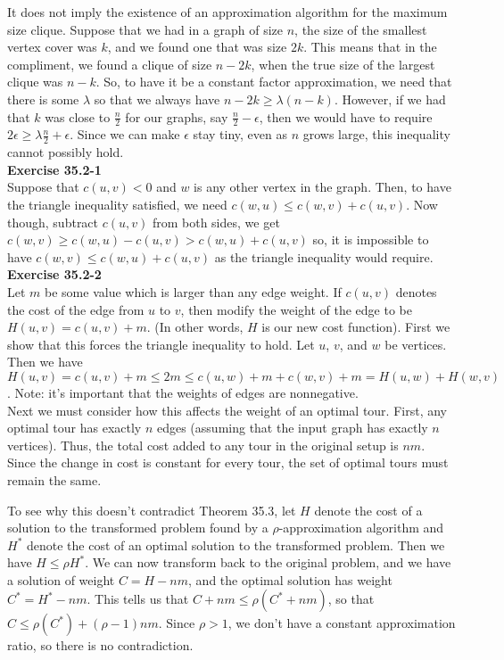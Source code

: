 \documentclass{article}
\begin{document}
It does not imply the existence of an approximation algorithm for the maximum size clique. Suppose that we had in a graph of size $n$, the size of the smallest vertex cover was $k$, and we found one that was size $2k$. This means that in the compliment, we found a clique of size $n-2k$, when the true size of the largest clique was $n-k$. So, to have it be a constant factor approximation, we need that there is some $\lambda$ so that we always have $n-2k \ge \lambda (n-k)$. However, if we had that $k$ was close to $\frac{n}{2}$ for our graphs, say $\frac{n}{2}-\epsilon$, then we would have to require $2\epsilon \ge \lambda \frac{n}{2} + \epsilon$. Since we can make $\epsilon$ stay tiny, even as $n$ grows large, this inequality cannot possibly hold.\\




\noindent\textbf{Exercise 35.2-1}\\

Suppose that $c(u,v) < 0$ and $w$ is any other vertex in the graph. Then, to have the triangle inequality satisfied, we need $c(w,u) \le c(w,v) + c(u,v)$. Now though, subtract $c(u,v)$ from both sides, we get $c(w,v) \ge c(w,u) - c(u,v) > c(w,u) +c(u,v)$ so, it is impossible to have $c(w,v) \le c(w,u)+c(u,v)$ as the triangle inequality would require.\\

\noindent\textbf{Exercise 35.2-2}\\

Let $m$ be some value which is larger than any edge weight.  If $c(u,v)$ denotes the cost of the edge from $u$ to $v$, then modify the weight of the edge to be $H(u,v) = c(u,v) + m$.  (In other words, $H$ is our new cost function).  First we show that this forces the triangle inequality to hold.  Let $u$, $v$, and $w$ be vertices.  Then we have $H(u,v) = c(u,v) + m \leq 2m \leq c(u,w) + m + c(w,v) + m = H(u,w) + H(w,v)$.  Note: it's important that the weights of edges are nonnegative.  \\

Next we must consider how this affects the weight of an optimal tour. First, any optimal tour has exactly $n$ edges (assuming that the input graph has exactly $n$ vertices).  Thus, the total cost added to any tour in the original setup is $nm$.  Since the change in cost is constant for every tour, the set of optimal tours must remain the same.  

To see why this doesn't contradict Theorem 35.3, let $H$ denote the cost of a solution to the transformed problem found by a $\rho$-approximation algorithm and $H^*$ denote the cost of an optimal solution to the transformed problem.  Then we have $H \leq \rho H^*$.  We can now transform back to the original problem, and we have a solution of weight $C = H - nm$, and the optimal solution has weight $C^* = H^* - nm$.  This tells us that  $C + nm \leq \rho (C^* + nm)$, so that $C \leq \rho(C^*) + (\rho - 1)nm$.  Since $\rho > 1$, we don't have a constant approximation ratio, so there is no contradiction. \\
\end{document}
